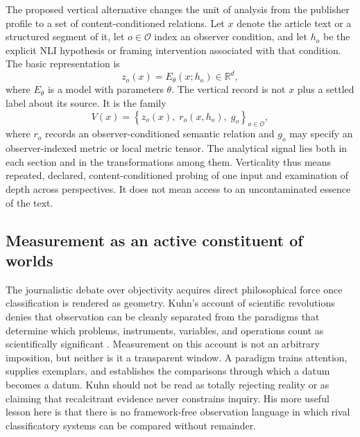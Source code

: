 The proposed vertical alternative changes the unit of analysis from the publisher profile to a set of content-conditioned relations. Let \(x\) denote the article text or a structured segment of it, let \(o\in\mathcal{O}\) index an observer condition, and let \(h_o\) be the explicit NLI hypothesis or framing intervention associated with that condition. The basic representation is
\begin{equation}
    z_o(x)=E_\theta(x;h_o)\in\mathbb{R}^{d},
    \label{eq:observer-embedding}
\end{equation}
where \(E_\theta\) is a model with parameters \(\theta\). The vertical record is not \(x\) plus a settled label about its source. It is the family
\begin{equation}
    V(x)=\left\{z_o(x),\;r_o(x,h_o),\;g_o\right\}_{o\in\mathcal{O}},
    \label{eq:vertical-record}
\end{equation}
where \(r_o\) records an observer-conditioned semantic relation and \(g_o\) may specify an observer-indexed metric or local metric tensor. The analytical signal lies both in each section and in the transformations among them. Verticality thus means repeated, declared, content-conditioned probing of one input and examination of depth across perspectives. It does not mean access to an uncontaminated essence of the text.

\subsection{Measurement as an active constituent of worlds}

The journalistic debate over objectivity acquires direct philosophical force once classification is rendered as geometry. Kuhn's account of scientific revolutions denies that observation can be cleanly separated from the paradigms that determine which problems, instruments, variables, and operations count as scientifically significant \citep{kuhn1962}. Measurement on this account is not an arbitrary imposition, but neither is it a transparent window. A paradigm trains attention, supplies exemplars, and establishes the comparisons through which a datum becomes a datum. Kuhn should not be read as totally rejecting reality or as claiming that recalcitrant evidence never constrains inquiry. His more useful lesson here is that there is no framework-free observation language in which rival classificatory systems can be compared without remainder.

